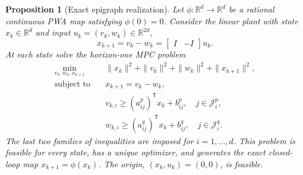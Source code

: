 \documentclass[10pt,a4paper]{amsart}
\newtheorem{proposition}{Proposition}
\newcommand{\R}{\mathbb{R}}
\begin{document}
\begin{proposition}[Exact epigraph realization]
\label{prop:fixed-dimensional-realization}
Let $\phi:\R^d\to\R^d$ be a rational continuous PWA map satisfying
$\phi(0)=0$.  Consider the linear plant with state $x_k\in\R^d$ and input
$u_k=(v_k,w_k)\in\R^{2d}$,
\begin{equation}
  x_{k+1}=v_k-w_k
  =\begin{bmatrix}I&-I\end{bmatrix}u_k.
  \label{eq:fixed-dimensional-plant}
\end{equation}
At each state solve the horizon-one MPC problem
\begin{subequations}
\label{eq:fixed-dimensional-mpc}
\begin{align}
 \min_{v_k,w_k,x_{k+1}}\quad&
  \|x_k\|^2+\|v_k\|^2+\|w_k\|^2+\|x_{k+1}\|^2,\\
 \text{subject to}\quad&
  x_{k+1}=v_k-w_k,\\
 &v_{k,i}\ge (a_{ij}^p)^{\mathsf T}x_k+b_{ij}^p,
   \quad j\in\mathcal J_i^p,\\
 &w_{k,i}\ge (a_{ij}^q)^{\mathsf T}x_k+b_{ij}^q,
   \quad j\in\mathcal J_i^q.
\end{align}
\end{subequations}
The last two families of inequalities are imposed for $i=1,\ldots,d$.
This problem is feasible for every state, has a unique optimizer, and generates
the exact closed-loop map $x_{k+1}=\phi(x_k)$.  The origin,
$(x_k,u_k)=(0,0)$, is feasible.
\end{proposition}
\end{document}
